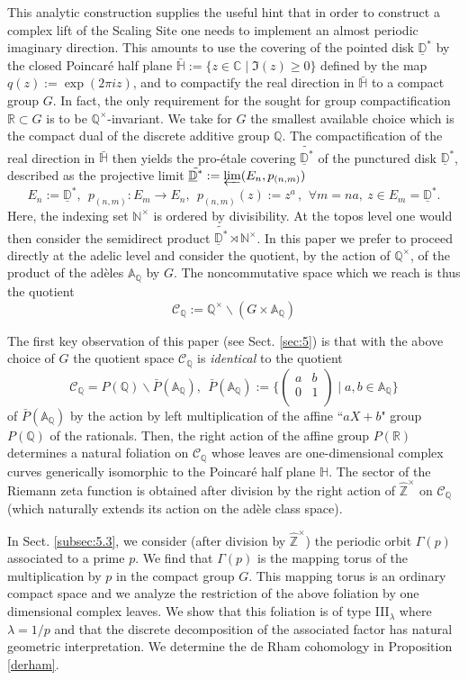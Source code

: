 \documentclass[graybox, envcountsect%
]{svmult}
\def\A{{\mathbb A}}
\def\C{{\mathbb C}}
\def\D{{\mathbb D}}
\def\N{{\mathbb N}}
\def\Q{{\mathbb Q}}
\def\R{{\mathbb R}}
\def\Z{{\mathbb Z}}
\def\H{{\mathbb H}}
\def\hatz{{\hat\Z^\times}}
\def\cC{{\mathcal C}}
\def\qqq{\,,\,~\forall}
\def\dst{{\underline \D^*}}
\def\caq{{\cC_\Q}}
\def\no{\noindent}
\def\nt{\N^{\times}}
\begin{document}
This analytic construction supplies the useful hint that in order to construct a complex lift of  the Scaling Site one needs to implement an almost periodic imaginary direction. This amounts to use the covering of the pointed disk $\dst$ by the closed Poincar\' e half plane $\bar\H:=\{ z\in \C\mid \Im(z)\geq 0\}$ defined by the map $q(z):=\exp(2\pi i z)$, and to compactify the real direction in $\bar\H$ to a compact group  $G$.   In fact, the only requirement for the sought for group compactification $\R\subset G$ is to be $\Q^\times$-invariant. We take for $G$ the smallest available choice which is the compact dual of the discrete additive group $\Q$. The compactification of the real direction in $\bar\H$ then yields  the pro-\'etale covering $\tilde \dst$ of the punctured disk $\dst$, described as the projective limit 
$\tilde \dst:=\varprojlim (E_n,p_{(n,m)})$ 
$$
	E_n:=\dst, \ \ p_{(n,m)}: E_m\to E_n, \ \  p_{(n,m)}(z):=z^a \qqq m=na, \ z\in E_m=\dst.
	$$
Here, the indexing set $\nt$ is ordered by divisibility. At the topos level one would then consider the semidirect product $\tilde \dst\rtimes \nt$. \newline
In this paper we prefer to proceed directly at the adelic level  and consider the quotient, by the action of $\Q^\times$,  of the product of  the ad\`eles  $\A_\Q$ by $G$. The noncommutative space which we reach is thus the quotient 
$$
\caq:=\Q^\times \backslash \left( G\times \A_\Q\right)
$$

\no The first key observation of this paper (see Sect. \ref{sec:5}) is that with the above choice of $G$ the quotient space $\caq$ is \emph{identical} to the quotient
$$
\caq=P(\Q)\backslash \bar P(\A_\Q), \ \  \bar P(\A_\Q):=\{\left(
\begin{array}{cc}
 a & b \\
 0 & 1 \\
\end{array}
\right)\mid a,b\in \A_\Q\}
$$
of $\bar P(\A_\Q)$ by the action by  left multiplication of the  affine ``$aX+b$" group $P(\Q)$ of the rationals. Then, the   right action of the affine group $P(\R)$ determines a natural foliation on $\caq$ whose leaves are  one-dimensional complex curves generically isomorphic to the Poincar\' e half plane $\H$. 
The sector of the Riemann zeta function is obtained after division by the right action of $\hatz$ on $\caq$ (which naturally extends its action on the ad\`ele class space).
 

 In Sect.  \ref{subsec:5.3}, we consider (after division by $\hatz$) the periodic orbit $\Gamma(p)$ associated to a prime $p$. We find that $\Gamma(p)$ is the mapping torus of the multiplication by $p$ in the compact group $G$. This mapping torus is an ordinary compact space and we analyze the restriction of the above foliation by one dimensional complex leaves. We show that this foliation is of type III$_\lambda$ where $\lambda=1/p$ and that the discrete decomposition of the associated factor has natural geometric interpretation. We determine the de Rham cohomology in Proposition \ref{derham}.
\end{document}
